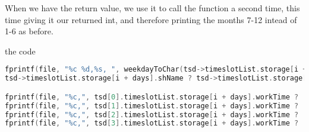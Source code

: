 When we have the return value, we use it to call the function a second time, this time giving it our returned int, and therefore printing the months 7-12 intead of 1-6 as before.

the code
\begin{lstlisting}[caption={Printing of dates},label={lst:Date_print},language=C]
fprintf(file, "%c %d,%s, ", weekdayToChar(tsd->timeslotList.storage[i + days].weekday), i + 1,
tsd->timeslotList.storage[i + days].shName ? tsd->timeslotList.storage[i + days].shName : " ");

fprintf(file, "%c,", tsd[0].timeslotList.storage[i + days].workTime ? 'P' : ' ');
fprintf(file, "%c,", tsd[1].timeslotList.storage[i + days].workTime ? 'P' : ' ');
fprintf(file, "%c,", tsd[2].timeslotList.storage[i + days].workTime ? 'U' : ' ');
fprintf(file, "%c,", tsd[3].timeslotList.storage[i + days].workTime ? 'U' : ' ');

\end{lstlisting}
                










